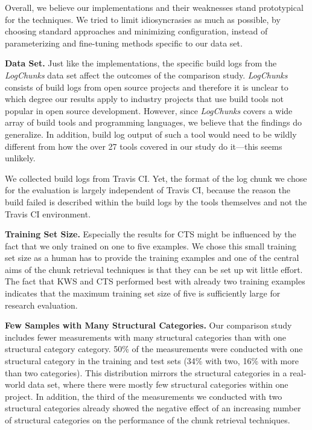 \documentclass[10pt,journal,compsoc]{IEEEtran}
\begin{document}
Overall, we believe our implementations and their weaknesses stand
prototypical for the techniques.
We tried to limit idiosyncrasies as
much as possible, by choosing standard approaches and minimizing
configuration, instead of parameterizing and fine-tuning methods
specific to our data set.

\textbf{Data Set.}
Just like the implementations, the specific build logs from the
\emph{LogChunks} data set affect
the outcomes of the comparison study.
\emph{LogChunks} consists of build
logs from open source projects and therefore it is unclear to which
degree our results apply to industry projects that use build tools not
popular in open source development.
However, since \emph{LogChunks}
covers a wide array of build tools and programming languages, we
believe that the findings do generalize.
In addition, build log output
of such a tool would need to be wildly different from how the over 27
tools covered in our study do it---this seems unlikely.

We collected build logs from
Travis CI.
Yet, the format of the log chunk we chose for the
evaluation is largely independent of Travis CI\@, because the reason
the build failed is described within the build logs by the tools
themselves and not the Travis CI environment.

\textbf{Training Set Size.}
Especially the results for CTS might be influenced by the fact that we
only trained on one to five examples.
We chose this small training
set size as a human has to provide the training examples and one of
the central aims of the chunk retrieval techniques is that they can be
set up wit little effort.
The fact that KWS and CTS performed best
with already two training examples indicates that the maximum training
set size of five is sufficiently large for research evaluation.

\textbf{Few Samples with Many Structural Categories.}
Our comparison study includes fewer measurements with many structural
categories than with one structural category category.
50\% of the measurements were conducted with one structural category
in the training and test sets
(34\% with two, 16\% with more than two categories).
This distribution mirrors the
structural categories in a real-world data set, where there were
mostly few structural categories within one project.
In addition, the
third of the measurements we conducted with two structural categories
already showed the negative effect of an increasing number of
structural categories on the performance of the chunk retrieval
techniques.
\end{document}
